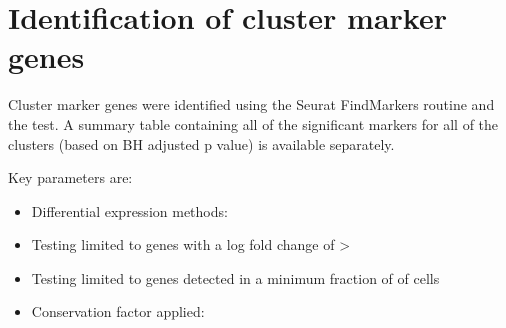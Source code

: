 \section{Identification of cluster marker genes}

Cluster marker genes were identified using the Seurat FindMarkers routine and the \deTest{} test. A summary table containing all of the significant markers for all of the clusters (based on BH adjusted p value) is available separately.

Key parameters are:

\begin{itemize}
\item Differential expression methods: \deTest
\item Testing limited to genes with a log fold change of > \threshUse
\item Testing limited to genes detected in a minimum fraction of \minPct{} of cells
\item Conservation factor applied: \conservedFactor
\end{itemize}

\clearpage